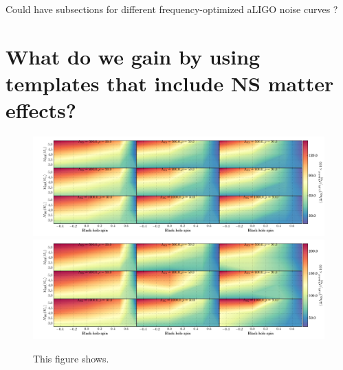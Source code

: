 \documentclass[aps,prd,amsmath,floats,floatfix, twocolumn,
superscriptaddress,nofootinbib,showpacs]{revtex4-1}
\newcommand{\prayush}{\textcolor{red!40!black}}
\begin{document}
\prayush{Could have subsections for different frequency-optimized aLIGO noise curves ?}

\hspace{5mm}



\section{What do we gain by using templates that include NS matter effects?}
% 
\begin{figure}
\centering    
\includegraphics[width=2.1\columnwidth]{plots-TT/TT_LambdaCIWidths68_3_Lambda_SNR.png}\\
\includegraphics[width=2.1\columnwidth]{plots-TT/TT_LambdaCIWidths90_0_Lambda_SNR.png}
\caption{This figure shows.}
\label{fig:TT_LambdaCIWidths90_0_Lambda_SNR}
\end{figure}
\end{document}
